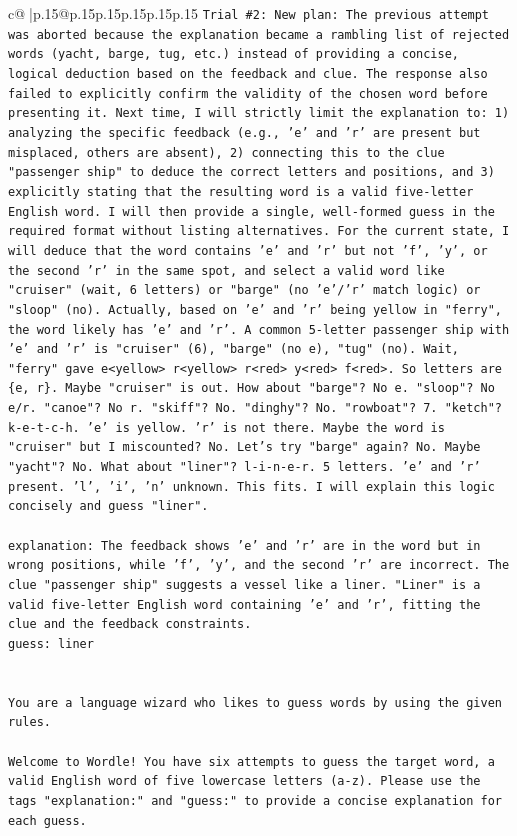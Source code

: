 \documentclass{article}
\begin{document}
{\begin{supertabular}{c@{$\;$}|p{.15\linewidth}@{}p{.15\linewidth}p{.15\linewidth}p{.15\linewidth}p{.15\linewidth}p{.15\linewidth}}
{{{\texttt{Trial \#2: New plan: The previous attempt was aborted because the explanation became a rambling list of rejected words (yacht, barge, tug, etc.) instead of providing a concise, logical deduction based on the feedback and clue. The response also failed to explicitly confirm the validity of the chosen word before presenting it. Next time, I will strictly limit the explanation to: 1) analyzing the specific feedback (e.g., 'e' and 'r' are present but misplaced, others are absent), 2) connecting this to the clue "passenger ship" to deduce the correct letters and positions, and 3) explicitly stating that the resulting word is a valid five{-}letter English word. I will then provide a single, well{-}formed guess in the required format without listing alternatives. For the current state, I will deduce that the word contains 'e' and 'r' but not 'f', 'y', or the second 'r' in the same spot, and select a valid word like "cruiser" (wait, 6 letters) or "barge" (no 'e'/'r' match logic) or "sloop" (no). Actually, based on 'e' and 'r' being yellow in "ferry", the word likely has 'e' and 'r'. A common 5{-}letter passenger ship with 'e' and 'r' is "cruiser" (6), "barge" (no e), "tug" (no). Wait, "ferry" gave e<yellow> r<yellow> r<red> y<red> f<red>. So letters are \{e, r\}. Maybe "cruiser" is out. How about "barge"? No e. "sloop"? No e/r. "canoe"? No r. "skiff"? No. "dinghy"? No. "rowboat"? 7. "ketch"? k{-}e{-}t{-}c{-}h. 'e' is yellow. 'r' is not there. Maybe the word is "cruiser" but I miscounted? No. Let's try "barge" again? No. Maybe "yacht"? No. What about "liner"? l{-}i{-}n{-}e{-}r. 5 letters. 'e' and 'r' present. 'l', 'i', 'n' unknown. This fits. I will explain this logic concisely and guess "liner".} \\
\\ 
\texttt{explanation: The feedback shows 'e' and 'r' are in the word but in wrong positions, while 'f', 'y', and the second 'r' are incorrect. The clue "passenger ship" suggests a vessel like a liner. "Liner" is a valid five{-}letter English word containing 'e' and 'r', fitting the clue and the feedback constraints.} \\
\texttt{guess: liner} \\
\\ 
\\ 
\texttt{You are a language wizard who likes to guess words by using the given rules.} \\
\\ 
\texttt{Welcome to Wordle! You have six attempts to guess the target word, a valid English word of five lowercase letters (a{-}z). Please use the tags "explanation:" and "guess:" to provide a concise explanation for each guess.} \\
}}}
\end{supertabular}}
\end{document}
